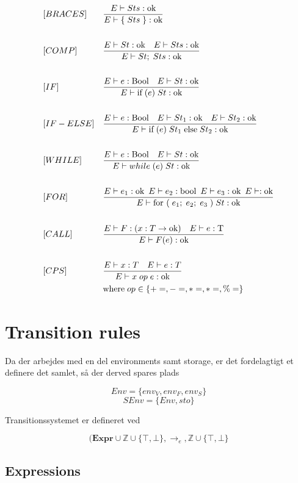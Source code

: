 \begin{align*}
&[BRACES] & & \frac{E\vdash Sts : \text{ok}}{E\vdash\{\;Sts\;\} : \text{ok}}\\\\
&[COMP] & &\frac{E \vdash St : \text{ok}\quad E \vdash Sts : \text{ok}}{E \vdash St;\;Sts : \text{ok}}\\\\
&[IF] & &\frac{E \vdash e : \text{Bool}\quad E \vdash St : \text{ok}}{E \vdash \text{if}\; (e)\;  St : \text{ok}}\\\\
&[IF-ELSE] & &\frac{E \vdash e : \text{Bool}\quad E \vdash St_1 : \text{ok}\quad E \vdash St_2 : \text{ok}}{E \vdash \text{if}\; (e)\; St_1\; \text{else} \;St_2 : \text{ok}}\\\\
&[WHILE] & &\frac{E \vdash e : \text{Bool}\quad E \vdash St : \text{ok}}{E \vdash while\; (e)\; St : \text{ok}}\\\\
&[FOR] & &\frac{E \vdash e_1 : \text{ok}\enskip E \vdash e_2 : \text{bool}\enskip E \vdash e_3 : \text{ok}\enskip E \vdash : \text{ok}}{E \vdash \text{for } (\; e_1;\; e_2;\; e_3\;) \; St : \text{ok}}\\\\
&[CALL] & &\frac{E \vdash F : (x : T \rightarrow \text{ok})\quad E \vdash e : \text{T}}{E \vdash F(e) : \text{ok}}\\\\
&[CPS] & &\frac{E \vdash x : T\quad E \vdash e : T}{E \vdash x\; op\; e : \text{ok}}\\
& & &\text{where}\; op \in \{+=, -=, *=, *=, \%=\}
\end{align*}


\tocless \section{Transition rules}
\noindent Da der arbejdes med en del environments samt storage, er det fordelagtigt et definere det samlet, så der derved spares plads

$$ Env = \{env_V, env_F, env_S\} $$
$$ SEnv = \{Env, sto\}$$

\noindent Transitionssystemet er defineret ved

$$ (\textbf{Expr} \cup \mathds{Z} \cup \{\top, \bot\}, \rightarrow_e, \mathds{Z} \cup \{\top, \bot\} $$

\tocless \subsection{Expressions}

